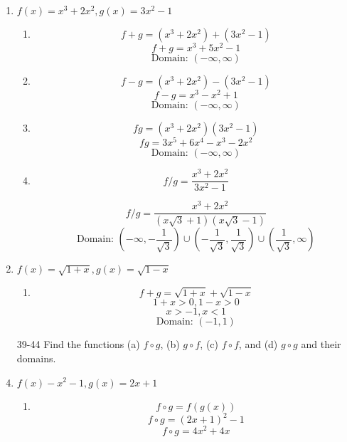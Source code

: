 \documentclass{article}
\begin{document}
\begin{enumerate}
		\item $f(x) = x^3 + 2x^2, g(x) = 3x^2 - 1$


		\begin{enumerate}
			\item 	$$f + g = (x^3 + 2x^2) + (3x^2 - 1)$$
			$$f + g = x^3 + 5x^2 - 1$$
			$$\text{Domain: } (-\infty, \infty)$$

			\item 

			$$f - g = (x^3 + 2x^2) - (3x^2 - 1)$$
			$$f - g = x^3 - x^2 + 1$$
			$$\text{Domain: } (-\infty, \infty)$$
			
			\item
			
			$$fg = (x^3 + 2x^2)(3x^2 - 1)$$
			$$fg = 3x^5 + 6x^4 - x^3 - 2x^2$$
			$$\text{Domain: } (-\infty, \infty)$$
			
			\item
			
			$$f / g = \frac{x^3 + 2x^2}{3x^2 - 1}$$
			
			$$f / g = \frac{x^3 + 2x^2}{(x\sqrt{3} + 1)(x\sqrt{3} - 1)}$$
			$$\text{Domain: } (-\infty, -\frac{1}{\sqrt{3}}) \cup (-\frac{1}{\sqrt{3}}, \frac{1}{\sqrt{3}}) \cup (\frac{1}{\sqrt{3}}, \infty)$$
		
		\end{enumerate}
			
		\item $f(x) = \sqrt{1 + x}, g(x) = \sqrt{1 - x}$
		
		\begin{enumerate}
			\item
			
			$$f + g = \sqrt{1 + x} + \sqrt{1 - x}$$
			$$1 + x > 0, 1 - x > 0$$
			$$x > -1, x < 1$$
			$$\text{Domain: } (-1, 1)$$
		\end{enumerate}
		
		\item[39-44] Find the functions (a) $f \circ g$, (b) $g \circ f$, (c) $f \circ f$, and (d) $g \circ g$ and their domains.
		
		\item $f(x) - x^2 - 1, g(x) = 2x + 1$
	
		\begin{enumerate}
			\item	
			$$f \circ g = f(g(x))$$
			$$f \circ g = (2x + 1)^2 - 1$$
			$$f \circ g = 4x^2 + 4x$$
		\end{enumerate}

	\end{enumerate}
\end{document}
